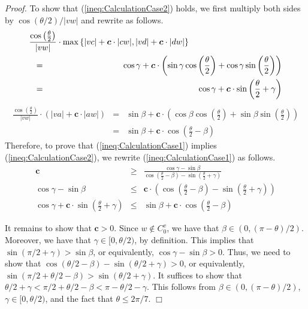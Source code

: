 \documentclass[12pt]{article}
\newenvironment{proof}{\emph{Proof.}}{\hfill $\Box$\\}
\newcommand{\const}{\ensuremath{\boldsymbol{c}}\xspace}
\begin{document}
\begin{proof}
  \noindent To show that (\ref{ineq:CalculationCase2}) holds, we first multiply both sides by $\cos (\theta/2) / |v w|$ and rewrite as follows. 
  \begin{eqnarray*}
    \frac{\cos \left( \frac{\theta}{2} \right)}{|v w|} \cdot \max \left\{|v c| + \const \cdot |c w|, |v d| + \const \cdot |d w|\right\}&& \\
    &\hspace{-6.5cm} =& \hspace{-3.1cm} \cos \gamma + \const \cdot \left( \sin \gamma \cos \left( \frac{\theta}{2} \right) + \cos \gamma \sin \left( \frac{\theta}{2} \right) \right) \\
    &\hspace{-6.5cm} =& \hspace{-3.1cm} \cos \gamma + \const \cdot \sin \left( \frac{\theta}{2} + \gamma \right)
  \end{eqnarray*}
  \begin{eqnarray*}
    \frac{\cos \left( \frac{\theta}{2} \right)}{|v w|} \cdot (|v a| + \const \cdot |a w|) &=& \sin \beta + \const \cdot \left( \cos \beta \cos \left( \frac{\theta}{2} \right) + \sin \beta \sin \left( \frac{\theta}{2} \right) \right) \\
    &=& \sin \beta + \const \cdot \cos \left( \frac{\theta}{2} - \beta \right)
  \end{eqnarray*}
  Therefore, to prove that (\ref{ineq:CalculationCase1}) implies (\ref{ineq:CalculationCase2}), we rewrite (\ref{ineq:CalculationCase1}) as follows. 
  \begin{eqnarray*}
    \const &\geq& \frac{\cos \gamma - \sin \beta}{\cos \left( \frac{\theta}{2} - \beta \right) - \sin \left( \frac{\theta}{2} + \gamma \right)} \\
    \cos \gamma - \sin \beta &\leq& \const \cdot \left( \cos \left( \frac{\theta}{2} - \beta \right) - \sin \left( \frac{\theta}{2} + \gamma \right) \right) \\
    \cos \gamma + \const \cdot \sin \left( \frac{\theta}{2} + \gamma \right) &\leq& \sin \beta + \const \cdot \cos \left( \frac{\theta}{2} - \beta \right) 
  \end{eqnarray*} 

  It remains to show that $\const > 0$. Since $w \not \in C_0^v$, we have that \mbox{$\beta \in (0, (\pi - \theta)/2)$}. Moreover, we have that $\gamma \in [0, \theta/2)$, by definition. This implies that $\sin (\pi/2 + \gamma) > \sin \beta$, or equivalently, $\cos \gamma - \sin \beta > 0$. Thus, we need to show that $\cos (\theta/2 - \beta) - \sin (\theta/2 + \gamma) > 0$, or equivalently, $\sin (\pi/2 + \theta/2 - \beta) > \sin (\theta/2 + \gamma)$. It suffices to show that $\theta/2 + \gamma < \pi/2 + \theta/2 - \beta < \pi - \theta/2 - \gamma$. This follows from $\beta \in (0, (\pi - \theta)/2)$, $\gamma \in [0, \theta/2)$, and the fact that $\theta \leq 2\pi/7$. 
\end{proof}
\end{document}
